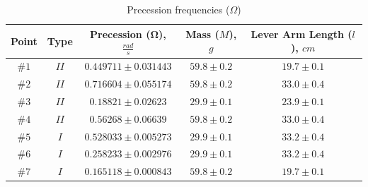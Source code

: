 \begin{table}[H]
  \centering
  \begin{tabular}{|c|c|c|c|c|}
    Point & Type & Precession ($\boldsymbol\Omega$), $\frac{rad}{s}$ & Mass ($M$), $g$ & Lever Arm Length ($l$), $cm$ \\ \hline
    $\#1$ & $II$ & $0.449711 \pm 0.031443$ & $59.8 \pm 0.2$ & $19.7 \pm 0.1$ \\ \hline
    $\#2$ & $II$ & $0.716604 \pm 0.055174$ & $59.8 \pm 0.2$ & $33.0 \pm 0.4$ \\ \hline
    $\#3$ & $II$ & $0.18821 \pm 0.02623$   & $29.9 \pm 0.1$ & $23.9 \pm 0.1$ \\ \hline
    $\#4$ & $II$ & $0.56268 \pm 0.06639$   & $59.8 \pm 0.2$ & $33.0 \pm 0.4$ \\ \hline
    $\#5$ & $I$  & $0.528033 \pm 0.005273$ & $29.9 \pm 0.1$ & $33.2 \pm 0.4$ \\ \hline
    $\#6$ & $I$  & $0.258233 \pm 0.002976$ & $29.9 \pm 0.1$ & $33.2 \pm 0.4$ \\ \hline
    $\#7$ & $I$  & $0.165118 \pm 0.000843$ & $59.8 \pm 0.2$ & $19.7 \pm 0.1$ \\ \hline
  \end{tabular}
  \caption{Precession frequencies ($\Omega$)}
  \label{tab:results:precession}
\end{table}


